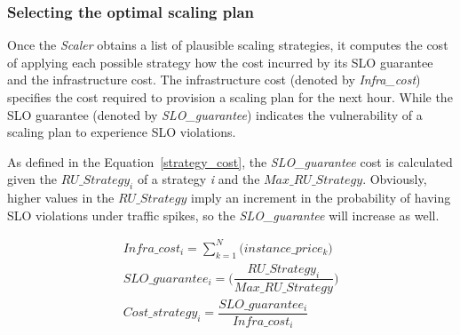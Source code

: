 \subsubsection{Selecting the optimal scaling plan}



Once the \emph{Scaler} obtains a list of plausible scaling strategies, it computes the cost of applying each possible strategy how the cost incurred by its SLO guarantee and the infrastructure cost. The infrastructure cost (denoted by \emph{Infra\_cost}) specifies the cost required to provision a scaling plan for the next hour. While the SLO guarantee (denoted by \emph{SLO\_guarantee}) indicates the vulnerability of a scaling plan to experience SLO violations. 

As defined in the Equation~\ref{strategy_cost}, the \emph{SLO\_guarantee} cost is calculated given the \emph{$RU\_Strategy_{i}$} of a strategy \emph{i} and the \emph{$Max\_RU\_Strategy$}. Obviously, higher values in the \emph{$RU\_Strategy$} imply an increment in the probability of having SLO violations under traffic spikes, so the \emph{SLO\_guarantee} will increase as well. 


\vspace{-5mm}
{\scriptsize
\begin{equation}\label{strategy_cost}
\begin{split}
Infra\_cost_{i} = \sum_{k=1}^N \big( instance\_price_{k} \big) \\
SLO\_guarantee_{i} =  \bigg( \dfrac{ RU\_Strategy_{i} } {Max\_RU\_Strategy} \bigg)  \\
Cost\_strategy_{i} = \dfrac{  SLO\_guarantee_{i}  } {Infra\_cost_{i}}
\end{split}
\end{equation}
}

